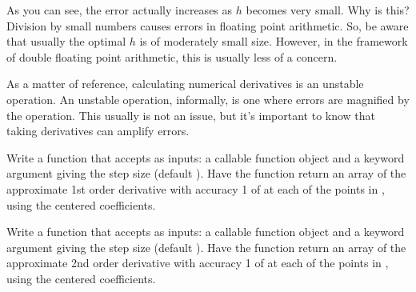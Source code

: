 As you can see, the error actually increases as $h$ becomes very small. Why is this? Division by small numbers causes errors in floating point arithmetic. So, be aware that usually the optimal $h$ is of moderately small size. However, in the framework of double floating point arithmetic, this is usually less of a concern.

As a matter of reference, calculating numerical derivatives is an unstable operation. An unstable operation, informally, is one where errors are magnified by the operation. This usually is not an issue, but it's important to know that taking derivatives can amplify errors.

\begin{problem}
Write a function  that accepts as inputs: a callable function object  and
a keyword argument  giving the step size (default ). Have the function return an array of the approximate 1st order derivative with accuracy 1 of  at each of the points in , using the centered  coefficients.
\end{problem}

\begin{problem}
Write a function  that accepts as inputs: a callable function object  and
a keyword argument  giving the step size (default ). Have the function return an array of the approximate 2nd order derivative with accuracy 1 of  at each of the points in , using the centered  coefficients.
\end{problem}

